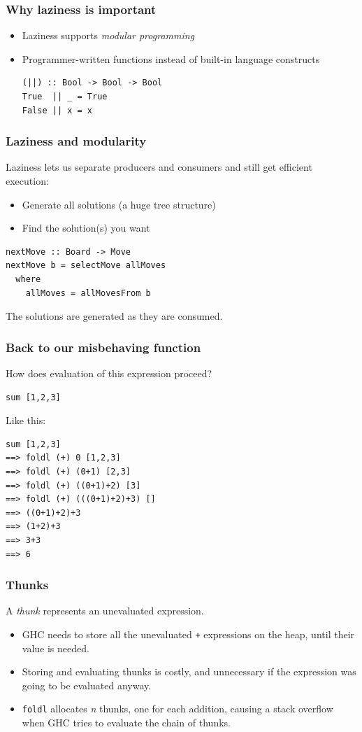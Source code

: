 \documentclass{beamer}
\begin{document}
\begin{frame}[fragile]
  \frametitle{Why laziness is important}

  \begin{itemize}
  \item Laziness supports \emph{modular programming}
  \item Programmer-written functions instead of built-in language
    constructs
    \begin{lstlisting}
(||) :: Bool -> Bool -> Bool
True  || _ = True
False || x = x
    \end{lstlisting}
  \end{itemize}
\end{frame}

\begin{frame}[fragile]
  \frametitle{Laziness and modularity}

  Laziness lets us separate producers and consumers and still get
  efficient execution:
  \begin{itemize}
  \item Generate all solutions (a huge tree structure)
  \item Find the solution(s) you want
  \end{itemize}

  \begin{lstlisting}
nextMove :: Board -> Move
nextMove b = selectMove allMoves
  where
    allMoves = allMovesFrom b
  \end{lstlisting}

  The solutions are generated as they are consumed.
\end{frame}

\begin{frame}[fragile]
\frametitle{Back to our misbehaving function}
How does evaluation of this expression proceed?
\begin{lstlisting}
sum [1,2,3]
\end{lstlisting}

Like this:
\begin{verbatim}
sum [1,2,3]
==> foldl (+) 0 [1,2,3]
==> foldl (+) (0+1) [2,3]
==> foldl (+) ((0+1)+2) [3]
==> foldl (+) (((0+1)+2)+3) []
==> ((0+1)+2)+3
==> (1+2)+3
==> 3+3
==> 6
\end{verbatim}
\end{frame}

\begin{frame}
  \frametitle{Thunks}

  A \emph{thunk} represents an unevaluated expression.

\begin{itemize}
\item GHC needs to store all the unevaluated \lstinline!+! expressions
  on the heap, until their value is needed.
\item Storing and evaluating thunks is costly, and unnecessary if the
  expression was going to be evaluated anyway.
\item \lstinline!foldl! allocates \emph{n} thunks, one for each
  addition, causing a stack overflow when GHC tries to evaluate the
  chain of thunks.
\end{itemize}
\end{frame}
\end{document}
